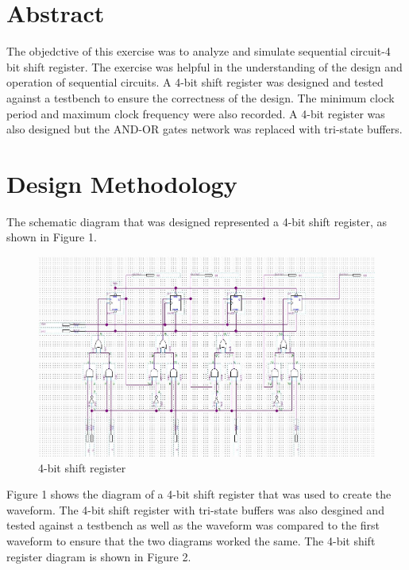 \documentclass[CMPE]{KGCOEReport}
\begin{document}
\maketitle

\section*{Abstract}
The objedctive of this exercise was to analyze and simulate sequential circuit-4 bit shift register. The exercise was helpful in the understanding of the design and operation of sequential circuits. A 4-bit shift register was designed and tested against a testbench to ensure the correctness of the design. The minimum clock period and maximum clock frequency were also recorded. A 4-bit register was also designed but the AND-OR gates network was replaced with tri-state buffers.

\section*{Design Methodology}
The schematic diagram that was designed represented a 4-bit shift register, as shown in Figure 1.

\begin{figure}[H]
	\centering
	\includegraphics[width=\textwidth]{Circuit1.png}
	\caption{4-bit shift register}
	\label{fig: Figure 1}
\end{figure}

Figure 1 shows the diagram of a 4-bit shift register that was used to create the waveform. The 4-bit shift register with tri-state buffers was also desgined and tested against a testbench as well as the waveform was compared to the first waveform to ensure that the two diagrams worked the same. The 4-bit shift register diagram is shown in Figure 2.
\end{document}

